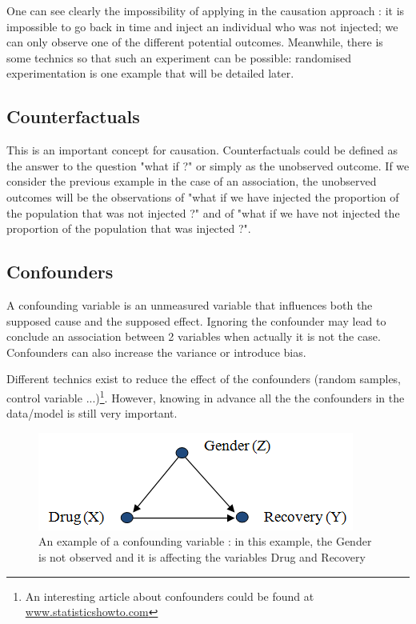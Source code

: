 \documentclass{article}
\begin{document}
One can see clearly the impossibility of applying in the causation approach : it is impossible to go back in time and inject an individual who was not injected; we can only observe one of the different potential outcomes. Meanwhile, there is some technics so that such an experiment can be possible: randomised experimentation is one example that will be detailed later.


\subsection{Counterfactuals}

This is an important concept for causation. Counterfactuals could be defined as the answer to the question "what if ?" or simply as the unobserved outcome. If we consider the previous example in the case of an association, the unobserved outcomes will be the observations of "what if we have injected the proportion of the population that was not injected ?" and of "what if we have not injected the proportion of the population that was injected ?".


\subsection{Confounders}

A confounding variable is an unmeasured variable that influences both the supposed cause and the supposed effect. Ignoring the confounder may lead to conclude an association between 2 variables when actually it is not the case. Confounders can also increase the variance or introduce bias.

Different technics exist to reduce the effect of the confounders (random samples, control variable ...)\footnote{An interesting article about confounders could be found at \href{https://www.statisticshowto.com/experimental-design/confounding-variable/}{www.statisticshowto.com}}. However, knowing in advance all the the confounders in the data/model is still very important.

\begin{figure}[h]
\centering
\includegraphics[width=0.5 \textwidth]{../figures/confounding.png}
\caption{An example of a confounding variable : in this example, the Gender is not observed and it is affecting the variables Drug and Recovery}
\end{figure}
\end{document}
